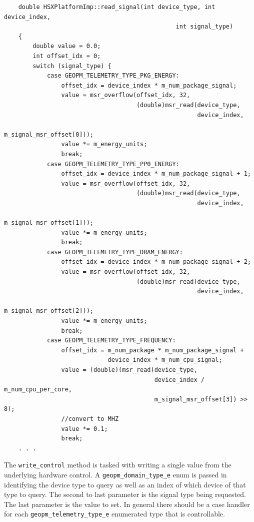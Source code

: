 \documentclass[11pt]{article}
\begin{document}
\begin{verbatim}
    double HSXPlatformImp::read_signal(int device_type, int device_index,
                                                int signal_type)
    {
        double value = 0.0;
        int offset_idx = 0;
        switch (signal_type) {
            case GEOPM_TELEMETRY_TYPE_PKG_ENERGY:
                offset_idx = device_index * m_num_package_signal;
                value = msr_overflow(offset_idx, 32,
                                     (double)msr_read(device_type,
                                                      device_index,
                                                      m_signal_msr_offset[0]));
                value *= m_energy_units;
                break;
            case GEOPM_TELEMETRY_TYPE_PP0_ENERGY:
                offset_idx = device_index * m_num_package_signal + 1;
                value = msr_overflow(offset_idx, 32,
                                     (double)msr_read(device_type,
                                                      device_index,
                                                      m_signal_msr_offset[1]));
                value *= m_energy_units;
                break;
            case GEOPM_TELEMETRY_TYPE_DRAM_ENERGY:
                offset_idx = device_index * m_num_package_signal + 2;
                value = msr_overflow(offset_idx, 32,
                                     (double)msr_read(device_type,
                                                      device_index,
                                                      m_signal_msr_offset[2]));
                value *= m_energy_units;
                break;
            case GEOPM_TELEMETRY_TYPE_FREQUENCY:
                offset_idx = m_num_package * m_num_package_signal +
                             device_index * m_num_cpu_signal;
                value = (double)(msr_read(device_type,
                                          device_index / m_num_cpu_per_core,
                                          m_signal_msr_offset[3]) >> 8);
                //convert to MHZ
                value *= 0.1;
                break;
    . . .
\end{verbatim}
The \verb#write_control# method is tasked with writing a single value
from the underlying hardware control. A \verb#geopm_domain_type_e#
enum is passed in identifying the device type to query as well as an
index of which device of that type to query. The second to last
parameter is the signal type being requested. The last parameter is
the value to set. In general there should be a case handler for each
\verb#geopm_telemetry_type_e# enumerated type that is controllable.
\end{document}
